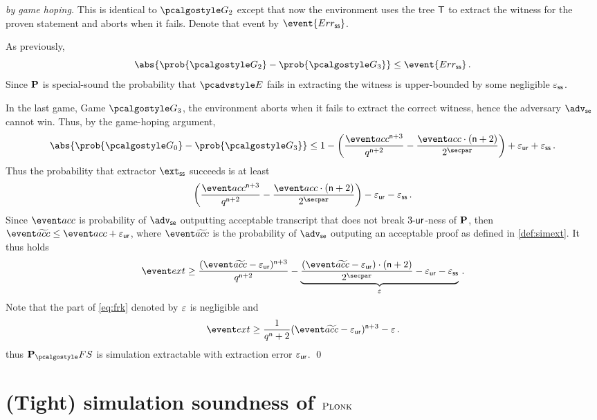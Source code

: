 \documentclass[runningheads,11pt]{llncs}
\theoremstyle{definition}
\begin{document}
\begin{proof}[by game hoping]
	This is identical to $\game{2}$ except that now the environment uses the tree $\mathsf{T}$ to extract the witness for the proven statement and aborts when it fails. Denote that event by $\event{\errss}$.
	
	As previously, 
	\[
		\abs{\prob{\game{2}} - \prob{\game{3}}} \leq \event{\errss}\,.
	\]
	Since $\mathbf{P}$ is special-sound the probability that $\env$ fails in extracting the witness is upper-bounded by some negligible $\varepsilon_{\mathsf{ss}}$.
	
	In the last game, Game $\game{3}$, the environment aborts when it fails to extract the correct witness, hence the adversary $\advse$ cannot win. 
	Thus, by the game-hoping argument, 
	\[
		\abs{\prob{\game{0}} - \prob{\game{3}}} \leq 1 - \left(\frac{\accProb^{\numberofconstrains + 3}}{q^{\numberofconstrains + 2}} - \frac{\accProb \cdot (\numberofconstrains + 2)}{2^\secpar}\right) + \epsur + \epsss\,.
	\]
	Thus the probability that extractor $\extss$ succeeds is at least
	\[
		\left(\frac{\accProb^{\numberofconstrains + 3}}{q^{\numberofconstrains + 2}} - \frac{\accProb \cdot (\numberofconstrains + 2)}{2^\secpar}\right) - \epsur - \epsss\,.
	\]
	Since $\accProb$ is probability of $\advse$ outputting acceptable transcript that does not break ${3\text{-}\mathsf{ur}}$-ness of $\mathbf{P}$, then $\waccProb \leq \accProb + \epsur$, where $\waccProb$ is the probability of $\advse$ outputing an acceptable proof as defined in \cref{def:simext}. It thus holds
	\[
 		\label{eq:frk}
 		\extProb \geq \frac{(\waccProb - \epsur)^{\numberofconstrains + 3}}{q^{\numberofconstrains + 2}} - \underbrace{\frac{(\waccProb - \epsur) \cdot (\numberofconstrains + 2)}{2^\secpar} - \epsur - \epsss}_{\eps}\,.
 	\]
 	Note that the part of \cref{eq:frk} denoted by $\varepsilon$ is negligible and 
 	\[
 		\extProb \geq \frac{1}{q^\numberofconstrains + 2} (\waccProb - \epsur)^{\numberofconstrains + 3} -\eps\,.
 	\] 
 	thus
 	$\plonkprot_\fs$ is simulation extractable with extraction error $\varepsilon_{\mathsf{ur}}$.
 	\qed
 \end{proof}

\section{(Tight) simulation soundness of $\textsc{Plonk}$}
\end{document}
